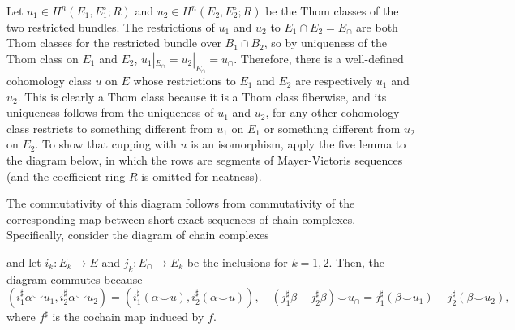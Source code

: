 \documentclass[10pt]{article}
\providecommand{\dg}{^\circ}
\begin{document}
Let $u_1\in H^n(E_1,E_1\dg; R)$ and $u_2\in H^n(E_2,E_2\dg; R)$
be the Thom classes of the two restricted bundles.
The restrictions of $u_1$ and $u_2$ to $E_1\cap E_2 = E_\cap$
are both Thom classes for the restricted bundle over $B_1\cap B_2$,
so by uniqueness of the Thom class on $E_1$ and $E_2$,
$u_1|_{E_\cap} = u_2|_{E_\cap} = u_\cap$.
Therefore, there is a well-defined cohomology class $u$ on $E$
whose restrictions to $E_1$ and $E_2$ are respectively
$u_1$ and $u_2$. This is clearly a Thom class because it is a Thom class
fiberwise, and its uniqueness follows from the uniqueness of $u_1$ and $u_2$,
for any other cohomology class restricts to something different
from $u_1$ on $E_1$ or something different from $u_2$ on $E_2$.
To show that cupping with $u$ is an isomorphism,
apply the five lemma to the diagram below,
in which the rows are segments of Mayer-Vietoris sequences
(and the coefficient ring $R$ is omitted for neatness).
\begin{center}
    \small
\end{center}
The commutativity of this diagram follows from
commutativity of the corresponding map between
short exact sequences of chain complexes. Specifically,
consider the diagram of chain complexes
\begin{center}
\end{center}
and let
$i_k\colon E_k\to E$ and $j_k\colon E_\cap\to E_k$
be the inclusions for $k=1,2$. Then, the diagram commutes because
\begin{equation*}
    (i_1^\sharp\alpha\smile u_1, i_2^\sharp\alpha\smile u_2)
    = (i_1^\sharp(\alpha\smile u), i_2^\sharp(\alpha\smile u)),\quad
    (j_1^\sharp\beta - j_2^\sharp\beta)\smile u_\cap
    = j_1^\sharp(\beta\smile u_1) - j_2^\sharp(\beta\smile u_2),
\end{equation*}
where $f^\sharp$ is the cochain map induced by $f$.
\end{document}
